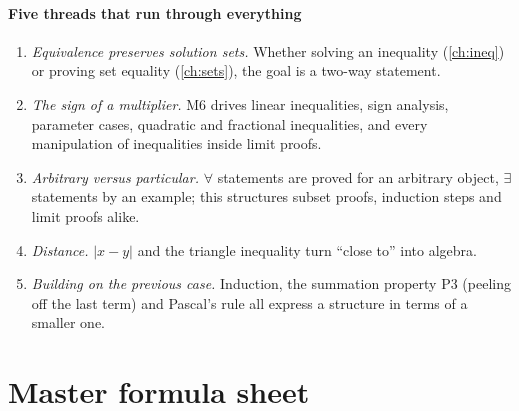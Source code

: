 \paragraph{Five threads that run through everything}
\begin{enumerate}[label=\arabic*.]
  \item \emph{Equivalence preserves solution sets.} Whether solving an inequality (\cref{ch:ineq}) or proving set equality
  (\cref{ch:sets}), the goal is a two-way statement.
  \item \emph{The sign of a multiplier.} M6 drives linear inequalities, sign analysis, parameter cases, quadratic and
  fractional inequalities, and every manipulation of inequalities inside limit proofs.
  \item \emph{Arbitrary versus particular.} $\forall$ statements are proved for an arbitrary object, $\exists$ statements by
  an example; this structures subset proofs, induction steps and limit proofs alike.
  \item \emph{Distance.} $|x-y|$ and the triangle inequality turn ``close to'' into algebra.
  \item \emph{Building on the previous case.} Induction, the summation property P3 (peeling off the last term) and Pascal's
  rule all express a structure in terms of a smaller one.
\end{enumerate}

\clearpage
\section*{Master formula sheet}

